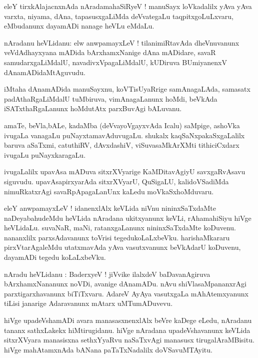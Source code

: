 \documentclass{article}
\begin{document}
\begin{mn}
eleY tirxkAlajacnxnAda nAradamahaSiRyeV ! manuSayx loVkadalilx yAva yAva varxta, niyama, dAna,
tapasusxgaLiMda deVvategaLu taqpitxgoLuLxvaru, eMbudanunx dayamADi nanage heVLu eMdaLu.
\end{mn}

\begin{mn}
nAradanu heVLidanu: elw anwpamayxLeV ! tilanimiRtavAda dheVnuvanunx veVdAdhayxyana mADida 
bArxhamxNanige dAna mADidare, savaR samudarxgaLiMdalU, navadivxVpagaLiMdalU, kUDiruva BUmiyanenxV 
dAnamADidaMtAguvudu.
\end{mn}

\begin{mn}
iMtaha dAnamADida manuSayxnu, koVTisUyaRrige samAnagaLAda, samasatx padAthaRgaLiMdalU tuMbiruva, 
vimAnagaLanunx hoMdi, beVkAda iSATxthaRgaLanunx hoMdutAtx parxBuvAgi bALuvanu.
\end{mn}

\begin{mn}
amaTe, beVla,bALe, kadaMba (deVvayoVgayxvAda Icalu) saMpige, ashoVka ivugaLa vanagaLu 
puNayxtamavAduvugaLu. shukalx kaqSaNxpakaSxgaLalilx baruva aSaTxmi, catuthiRV, dAvxdashiV,
viSuvasaMkArXMti tithiciCxdarx ivugaLu puNayxkaragaLu.
\end{mn}

\begin{mn}
ivugaLalilx upavAsa mADuva sitxrXVyarige KaMDitavAgiyU savxgaRvAsavu siguvudu. upavAsapirxyarAda
sitxrXVyarU, QuSigaLU, kalidoVSadiMda nimuRkatxrAgi savaRpApagaLanUnx kaLedu moVkaSxhoMduvaru.
\end{mn}

\begin{mn}
eleY anwpamayxLeV ! idanenxlAlx keVLida niVnu nininxSaTxdaMte naDeyabahudeMdu heVLida nAradana 
ukitxyanunx keVLi, rAhamahiSiyu hiVge heVLidaLu. suvaNaR, maNi, ratanxgaLanunx 
nininxSaTxdaMte koDuvenu. nananxlilx parxsAdavanunx toVrisi tegedukoLaLxbeVku. harishaMkararu
pirxVtarAgaleMdu utatxmavAda yAva vasutxvanunx beVkAdarU koDuvenu, dayamADi tegedu koLaLxbeVku.
\end{mn}

\begin{mn}
nAradu heVLidanu : BaderxyeV ! jiVvike ilalxdeV baDavanAgiruva bArxhamxNananunx noVDi, avanige 
dAnamADu. nAvu shiVlasaMpananxrAgi parxtigarxhavanunx biTiTxvaru.
AdareV AyAya vasutxgaLa mAhAtemxyanunx tiLisi janarige Adaravanunx mAtarx uMTumADuvevu.
\end{mn}

\begin{mn}
hiVge upadeVshamADi avara manasasxnenxlAlx beVre kaDege eLedu, nAradanu tananx sathxLakekx 
hiMtirugidanu. hiVge nAradana upadeVshavanunx keVLida sitxrXVyara manasisxna sethxYyaRvu 
naSaTxvAgi manasusx tirugalAraMBisitu. hiVge mahAtamxnAda bANana paTaTxNadalilx doVSavuMTAyitu.
\end{mn}
\end{document}
